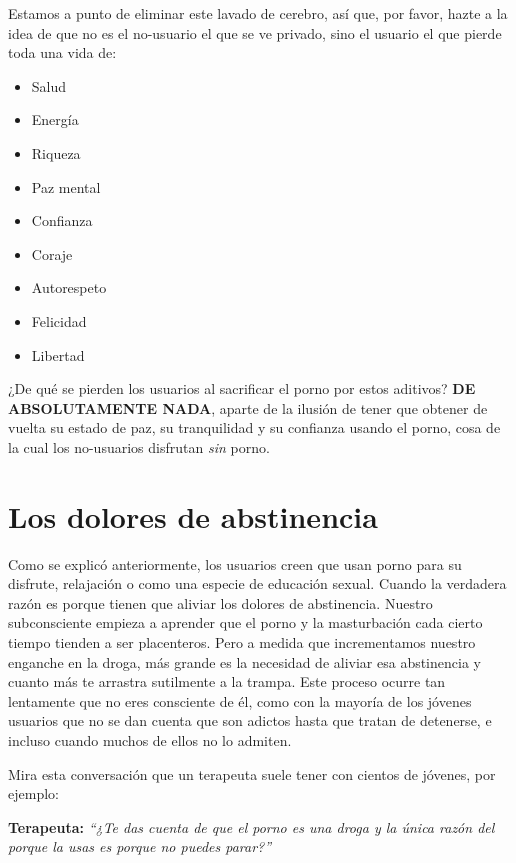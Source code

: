 \documentclass[
  spanish,
  openany]{book}
\providecommand{\tightlist}{%
  \setlength{\itemsep}{0pt}\setlength{\parskip}{0pt}}
\begin{document}
Estamos a punto de eliminar este lavado de cerebro, así que, por favor, hazte a la idea de que no es el no-usuario el que se ve privado, sino el usuario el que pierde toda una vida de:

\begin{itemize}
\tightlist
\item
  Salud
\item
  Energía
\item
  Riqueza
\item
  Paz mental
\item
  Confianza
\item
  Coraje
\item
  Autorespeto
\item
  Felicidad
\item
  Libertad
\end{itemize}

¿De qué se pierden los usuarios al sacrificar el porno por estos aditivos? \textbf{DE ABSOLUTAMENTE NADA}, aparte de la ilusión de tener que obtener de vuelta su estado de paz, su tranquilidad y su confianza usando el porno, cosa de la cual los no-usuarios disfrutan \emph{sin} porno.

\hypertarget{los-dolores-de-abstinencia}{%
\section{Los dolores de abstinencia}\label{los-dolores-de-abstinencia}}

Como se explicó anteriormente, los usuarios creen que usan porno para su disfrute, relajación o como una especie de educación sexual. Cuando la verdadera razón es porque tienen que aliviar los dolores de abstinencia. Nuestro subconsciente empieza a aprender que el porno y la masturbación cada cierto tiempo tienden a ser placenteros. Pero a medida que incrementamos nuestro enganche en la droga, más grande es la necesidad de aliviar esa abstinencia y cuanto más te arrastra sutilmente a la trampa. Este proceso ocurre tan lentamente que no eres consciente de él, como con la mayoría de los jóvenes usuarios que no se dan cuenta que son adictos hasta que tratan de detenerse, e incluso cuando muchos de ellos no lo admiten.

Mira esta conversación que un terapeuta suele tener con cientos de jóvenes, por ejemplo:

\textbf{Terapeuta:} \emph{``¿Te das cuenta de que el porno es una droga y la única razón del porque la usas es porque no puedes parar?''}
\end{document}
